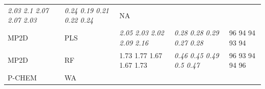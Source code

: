 \documentclass[utf8]{frontiersHLTH} %
\begin{document}
\begin{longtable}[]{@{}lllll@{}}
\begin{minipage}[t]{0.19\columnwidth}
\emph{2.03 2.1 2.07 2.07 2.03}\strut
\end{minipage} & \begin{minipage}[t]{0.19\columnwidth}\raggedright\strut
\emph{0.24 0.19 0.21 0.22 0.24}\strut
\end{minipage} & \begin{minipage}[t]{0.27\columnwidth}\raggedright\strut
NA\strut
\end{minipage}\tabularnewline
\begin{minipage}[t]{0.13\columnwidth}\raggedright\strut
MP2D\strut
\end{minipage} & \begin{minipage}[t]{0.08\columnwidth}\raggedright\strut
PLS\strut
\end{minipage} & \begin{minipage}[t]{0.19\columnwidth}\raggedright\strut
\emph{2.05 2.03 2.02 2.09 2.16}\strut
\end{minipage} & \begin{minipage}[t]{0.19\columnwidth}\raggedright\strut
\emph{0.28 0.28 0.29 0.27 0.28}\strut
\end{minipage} & \begin{minipage}[t]{0.27\columnwidth}\raggedright\strut
96 94 94 93 94\strut
\end{minipage}\tabularnewline
\begin{minipage}[t]{0.13\columnwidth}\raggedright\strut
MP2D\strut
\end{minipage} & \begin{minipage}[t]{0.08\columnwidth}\raggedright\strut
RF\strut
\end{minipage} & \begin{minipage}[t]{0.19\columnwidth}\raggedright\strut
1.73 1.77 1.67 1.67 1.73\strut
\end{minipage} & \begin{minipage}[t]{0.19\columnwidth}\raggedright\strut
\emph{0.46 0.45 0.49 0.5 0.47}\strut
\end{minipage} & \begin{minipage}[t]{0.27\columnwidth}\raggedright\strut
96 93 94 94 96\strut
\end{minipage}\tabularnewline
\begin{minipage}[t]{0.13\columnwidth}\raggedright\strut
P-CHEM\strut
\end{minipage} & \begin{minipage}[t]{0.08\columnwidth}\raggedright\strut
WA\strut
\end{minipage} & \begin{minipage}[t]{0.19\columnwidth}\raggedright\strut

\end{minipage}
\end{longtable}
\end{document}
